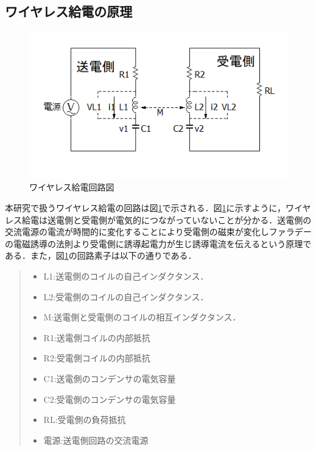 \documentclass[12pt]{jarticle}
\begin{document}
\subsection{ワイヤレス給電の原理}
\begin{figure}[h]
	\centering
	\includegraphics[]{wpt_2020128.png}
	\caption{ワイヤレス給電回路図}
	\label{fig:wpt_kairo}
\end{figure}
本研究で扱うワイヤレス給電の回路は図\ref{fig:wpt_kairo}で示される．図\ref{fig:wpt_kairo}に示すように，ワイヤレス給電は送電側と受電側が電気的につながっていないことが分かる．送電側の交流電源の電流が時間的に変化することにより受電側の磁束が変化しファラデーの電磁誘導の法則より受電側に誘導起電力が生じ誘導電流を伝えるという原理である．また，図\ref{fig:wpt_kairo}の回路素子は以下の通りである．
\begin{quote}
	\begin{itemize}
		\item L1:送電側のコイルの自己インダクタンス．
		\item L2:受電側のコイルの自己インダクタンス．
		\item M:送電側と受電側のコイルの相互インダクタンス．
		\item R1:送電側コイルの内部抵抗
		\item R2:受電側コイルの内部抵抗
		\item C1:送電側のコンデンサの電気容量
		\item C2:受電側のコンデンサの電気容量
		\item RL:受電側の負荷抵抗
		\item 電源:送電側回路の交流電源
	\end{itemize}
\end{quote}
\clearpage
\end{document}
